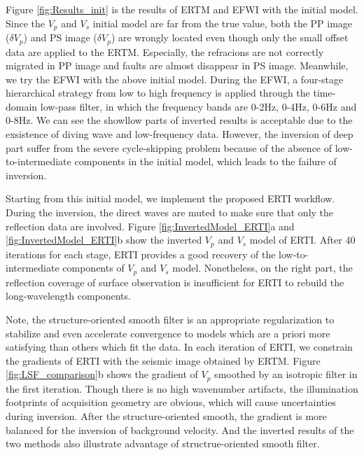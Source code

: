 Figure \ref{fig:Results_init} is the results of ERTM and EFWI with the initial model. Since the
$V_p$ and $V_s$ initial model are far from the true value, both the PP image ($\delta V_p$) and PS
image ($\delta V_p$) are wrongly located even though only the small offset data are applied to the
ERTM. Especially, the refracions are not correctly migrated in PP image and faults are almost
disappear in PS image. Meanwhile, we try the EFWI with the above initial model. 
During the EFWI, 
a four-stage hierarchical strategy 
from low to high frequency is applied through the time-domain low-pass filter, in which the frequency bands
are 0-2Hz, 0-4Hz, 0-6Hz and 0-8Hz. 
We can see the showllow parts of inverted results 
is acceptable due to the exsistence of diving wave and low-frequency data. However, the inversion of
deep part suffer from the severe cycle-skipping problem because of the absence of
low-to-intermediate components in the initial model, which leads to the failure of inversion.

Starting from this initial model, we implement the proposed ERTI workflow.
During the inversion, the direct waves are muted to make sure that only the reflection data are involved.
Figure \ref{fig:InvertedModel_ERTI}a and \ref{fig:InvertedModel_ERTI}b show the inverted $V_p$ and $V_s$ model of ERTI.
After
40 iterations for each stage, ERTI provides a good recovery of the low-to-intermediate components of
$V_p$ and $V_s$ model. 
Nonetheless, on the right part, the reflection coverage of surface observation is insufficient for
ERTI to rebuild the long-wavelength components. 

Note, the structure-oriented smooth filter is an appropriate regularization to stabilize
and even accelerate convergence to models which are a priori more satisfying than others which fit
the data. In each iteration of ERTI, we constrain the gradients of ERTI with the seismic image
obtained by ERTM. Figure \ref{fig:LSF_comparison}b shows the gradient of
$V_p$ smoothed by an isotropic filter in the first iteration. Though there is no high wavenumber
artifacts, the illumination footprints of acquisition geometry are obvious, which will cause
uncertainties during inversion. After the structure-oriented smooth, the gradient is more balanced
for the inversion of background velocity. And the inverted results of the two methods also
illustrate advantage of structrue-oriented smooth filter.

